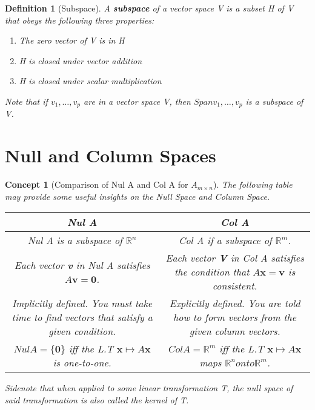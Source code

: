 \documentclass[12pt]{report}
\newtheorem{dfn}{Definition}
\newtheorem{cpt}{Concept}
\newcommand{\mtx}[3]{$#1_{#2\times #3}$}
\begin{document}
\begin{dfn}[Subspace]

A \textbf{subspace} of a vector space V is a subset H of V that obeys the following three properties:

\begin{enumerate}

\item The zero vector of V is in H
\item H is closed under vector addition
\item H is closed under scalar multiplication

\end{enumerate}

Note that if $v_1,\ldots,v_p$ are in a vector space V, then $Span{v_1,\ldots,v_p}$ is a subspace of V.

\end{dfn}

\section{Null and Column Spaces}

\begin{cpt}[Comparison of Nul A and Col A for \mtx{A}{m}{n}]

The following table may provide some useful insights on the Null Space and Column Space.

\begin{tabular}{|c|c|}

\textbf{Nul A} &\textbf{Col A} \\
\hline
Nul A is a subspace of $\mathbb{R}^n$ & Col A if a subspace of $\mathbb{R}^m$. \\
\hline
Each vector \textbf{v} in Nul A satisfies $A\bm{v}=\bm{0}$. & Each vector \textbf{V} in Col A satisfies the condition that $A\bm{x}=\bm{v}$ is consistent. \\
\hline
Implicitly defined. You must take time to find vectors that satisfy a given condition. & Explicitly defined. You are told how to form vectors from the given column vectors. \\
\hline
$Nul A = \{\bm{0}\}$ iff the L.T $\bm{x} \mapsto A\bm{x}$ is one-to-one. & $Col A = \mathbb{R}^m$ iff the L.T $\bm{x} \mapsto A\bm{x}$ maps $\mathbb{R}^n onto \mathbb{R}^m$.

\end{tabular}

Sidenote that when applied to some linear transformation T, the null space of said transformation is also called the kernel of T.

\end{cpt}
\end{document}

